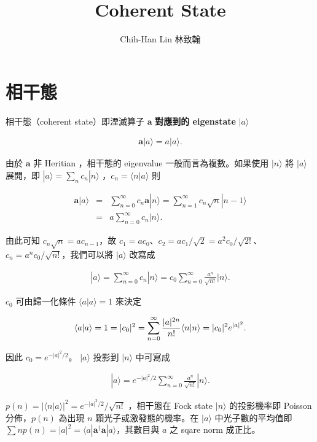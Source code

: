\documentclass[pop,reprint]{revtex4-1}
\newcommand{\bra}[1]{\langle#1|}
\newcommand{\ket}[1]{|#1\rangle }
\newcommand{\braket}[2]{\langle#1|#2\rangle }
\begin{document}
\title{Coherent State }
\author{Chih-Han Lin 林致翰}

\begin{abstract}

\end{abstract}
\maketitle
\section{相干態}
相干態（coherent state）即湮滅算子 $ \bm{a} $ \textbf{對應到的 eigenstate} $ \ket{a} $ 

\begin{eqnarray}
\bm{a}\ket{a}=a\ket{a}.
\end{eqnarray}

由於 $ \bm{a} $ 非 Heritian ，相干態的 eigenvalue 一般而言為複數。如果使用 $ \ket{n} $ 將 $ \ket{a} $ 展開，即 $ \ket{a}=\sum_n c_n\ket{n} $ ，$ c_n=\braket{n}{a} $ 則

\begin{eqnarray}
\bm{a}\ket{a}&=&\sum_{n=0}^\infty c_n\bm{a}\ket{n}=\sum_{n=1}^\infty c_n\sqrt{n}\ket{n-1}\\&=&a\sum_{n=0}^\infty c_n\ket{n}.
\end{eqnarray}

由此可知 $  c_n\sqrt{n}=ac_{n-1} $，故 $ c_1=ac_0 $、$ c_2=ac_1/\sqrt{2}=a^2c_0/\sqrt{2!} $、$ c_n=a^nc_0/\sqrt{n!} $，我們可以將 $ \ket{a} $ 改寫成

\begin{eqnarray}
\ket{a}=\sum_{n=0}^\infty c_n\ket{n}=c_0\sum_{n=0}^\infty\frac{a^n}{\sqrt{n!}}\ket{n}.
\end{eqnarray}

$ c_0 $ 可由歸一化條件 $ \braket{a}{a}=1 $ 來決定

\begin{eqnarray}
\protect\braket{a}{a}=1=|c_0|^2=\sum_{n=0}^\infty\frac{|a|^{2n}}{n!}\braket{n}{n}=|c_0|^2e^{|a|^2}.
\end{eqnarray}

因此 $ c_0 =e^{-|a|^2/2} $。 $ \ket{a} $ 投影到 $ \ket{n} $ 中可寫成

\begin{eqnarray}\label{coherent}
\ket{a}=e^{-|a|^2/2}\sum_{n=0}^\infty\frac{a^n}{\sqrt{n!}}\ket{n}.
\end{eqnarray} 

$ p(n)=|\braket{n}{a}|^2=e^{-|a|^2/2}/\sqrt{n!} $ ，相干態在 Fock state $ \ket{n} $ 的投影機率即 Poisson 分佈，$ p(n) $ 為出現 $ n $ 顆光子或激發態的機率。在 $ \ket{a} $ 中光子數的平均值即 $ \sum np(n)=|a|^2=\bra{a}\bm{a}^\dag\bm{a}\ket{a} $，其數目與 $ a $ 之 sqare norm 成正比。
\end{document}
